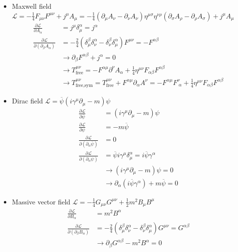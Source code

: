 \documentclass[10pt,a4paper]{book}
\theoremstyle{definition}
\begin{document}
\begin{itemize}
\item Maxwell field $\mathcal{L}=-\frac{1}{4}F_{\mu\nu}F^{\mu\nu}+j^\mu A_\mu=-\frac{1}{4}(\partial_\mu A_\nu-\partial_\nu A_\nu)\eta^{\mu\sigma}\eta^{\nu\rho}(\partial_\sigma A_\rho-\partial_\rho A_\sigma)+j^\mu A_\mu$
\begin{align}
\frac{\partial\mathcal{L}}{\partial A_\alpha}&=j^\mu\delta^\alpha_\mu=j^\alpha\\
\frac{\partial\mathcal{L}}{\partial(\partial_\beta A_\alpha)}&=-\frac{2}{4}(\delta^\beta_\mu\delta^\alpha_\nu-\delta^\beta_\nu\delta^\alpha_\mu)F^{\mu\nu}=-F^{\alpha\beta}\\
&\rightarrow\partial_\beta F^{\alpha\beta}+j^\alpha=0\\
&\rightarrow T^{\mu\nu}_\text{free}=-F^{\alpha\mu}\partial^\nu A_\alpha+\frac{1}{4}\eta^{\mu\nu}F_{\alpha\beta}F^{\alpha\beta}\\
&\rightarrow T^{\mu\nu}_\text{free,sym}=T^{\mu\nu}_\text{free}+F^{\alpha\mu}\partial_\alpha A^\nu=-F^{\alpha\mu}F^\nu_{\;\alpha}+\frac{1}{4}\eta^{\mu\nu}F_{\alpha\beta}F^{\alpha\beta}
\end{align}
\item Dirac field $\mathcal{L}=\overline{\psi}(i\gamma^\mu\partial_\mu-m)\psi$
\begin{align}
\frac{\partial\mathcal{L}}{\partial \overline\psi}&=(i\gamma^\mu\partial_\mu-m)\psi\\
\frac{\partial\mathcal{L}}{\partial \psi}&=-m\overline\psi\\
\frac{\partial\mathcal{L}}{\partial(\partial_\alpha \overline\psi)}&=0\\
\frac{\partial\mathcal{L}}{\partial(\partial_\alpha \psi)}&=\overline\psi i\gamma^\mu\delta^\alpha_\mu=i\overline\psi \gamma^\alpha\\
&\rightarrow (i\gamma^\mu\partial_\mu-m)\psi=0\\
&\rightarrow \partial_\alpha(i\overline\psi\gamma^\alpha)+m\overline\psi=0
\end{align}
\item Massive vector field $\mathcal{L}=-\frac{1}{4}G_{\mu\nu}G^{\mu\nu}+\frac{1}{2}m^2B_\mu B^\mu$
\begin{align}
\frac{\partial\mathcal{L}}{\partial B_\alpha}&=m^2B^\alpha\\
\frac{\partial\mathcal{L}}{\partial(\partial_\beta B_\alpha)}&=-\frac{2}{4}(\delta^\beta_\mu\delta^\alpha_\nu-\delta^\beta_\nu\delta^\alpha_\mu)G^{\mu\nu}=G^{\alpha\beta}\\
&\rightarrow\partial_\beta G^{\alpha\beta}-m^2B^\alpha=0
\end{align}

\end{itemize}
\end{document}
